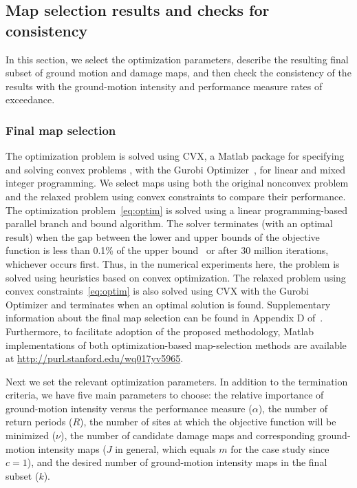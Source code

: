 \subsection{Map selection results and checks for consistency}
In this section, we select the optimization parameters, describe the resulting final subset of ground motion and damage maps, and then check the consistency of the results with the ground-motion intensity and performance measure rates of exceedance. 

\subsubsection{Final map selection} \label{sec:finalresults}
The optimization problem is solved using CVX, a Matlab package for specifying and solving convex problems \cite{grant_cvx:_2012, grant_graph_2008}, with the Gurobi Optimizer~\cite{gurobi_optimization_gurobi_2013}, for linear and mixed integer programming. We select maps using both the original nonconvex problem and the relaxed problem using convex constraints to compare their performance. The optimization problem~\eqref{eq:optim} is solved using a linear programming-based parallel branch and bound algorithm. The solver terminates (with an optimal result) when the gap between the lower and upper bounds of the objective function is less than 0.1\% of the upper bound~\cite{gurobi_optimization_gurobi_2013} or after 30 million iterations, whichever occurs first. Thus, in the numerical experiments here, the problem is solved using heuristics based on convex optimization. The relaxed problem using convex constraints~\ref{eq:optim} is also solved using CVX with the Gurobi Optimizer and terminates when an optimal solution is found. Supplementary information about the final map selection can be found in Appendix D of~\cite{miller_seismic_2014}. Furthermore, to facilitate adoption of the proposed methodology, Matlab implementations of both optimization-based map-selection methods are available at \href{http://purl.stanford.edu/wq017yv5965}{http://purl.stanford.edu/wq017yv5965}.

Next we set the relevant optimization parameters. In addition to the termination criteria, we have five main parameters to choose: the relative importance of ground-motion intensity versus the performance measure ($\alpha$), the number of return periods ($R$), the number of sites at which the objective function will be minimized ($\nu$), the number of candidate damage maps and corresponding ground-motion intensity maps ($J$ in general, which equals $m$ for the case study since $c=1$), and the desired number of ground-motion intensity maps in the final subset ($k$). 

